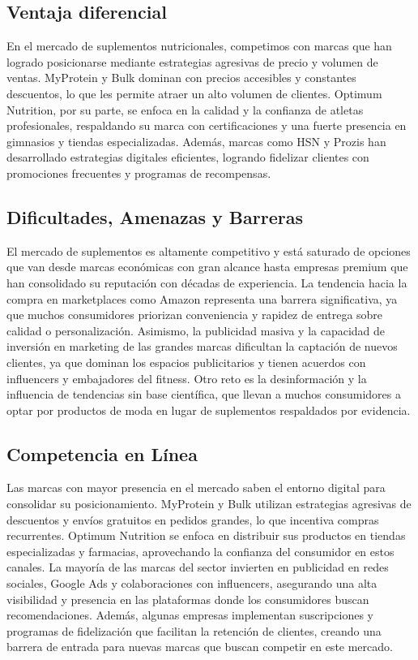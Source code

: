 \documentclass[11pt,a4paper]{report}
\begin{document}
\subsection{Ventaja diferencial}
En el mercado de suplementos nutricionales, competimos con marcas que han logrado posicionarse mediante estrategias agresivas de precio y volumen de ventas. MyProtein y Bulk dominan con precios accesibles y constantes descuentos, lo que les permite atraer un alto volumen de clientes. Optimum Nutrition, por su parte, se enfoca en la calidad y la confianza de atletas profesionales, respaldando su marca con certificaciones y una fuerte presencia en gimnasios y tiendas especializadas. Además, marcas como HSN y Prozis han desarrollado estrategias digitales eficientes, logrando fidelizar clientes con promociones frecuentes y programas de recompensas.

\subsection{Dificultades, Amenazas y Barreras}
El mercado de suplementos es altamente competitivo y está saturado de opciones que van desde marcas económicas con gran alcance hasta empresas premium que han consolidado su reputación con décadas de experiencia. La tendencia hacia la compra en marketplaces como Amazon representa una barrera significativa, ya que muchos consumidores priorizan conveniencia y rapidez de entrega sobre calidad o personalización. Asimismo, la publicidad masiva y la capacidad de inversión en marketing de las grandes marcas dificultan la captación de nuevos clientes, ya que dominan los espacios publicitarios y tienen acuerdos con influencers y embajadores del fitness. Otro reto es la desinformación y la influencia de tendencias sin base científica, que llevan a muchos consumidores a optar por productos de moda en lugar de suplementos respaldados por evidencia.


\subsection{Competencia en Línea}
Las marcas con mayor presencia en el mercado saben el entorno digital para consolidar su posicionamiento. MyProtein y Bulk utilizan estrategias agresivas de descuentos y envíos gratuitos en pedidos grandes, lo que incentiva compras recurrentes. Optimum Nutrition se enfoca en distribuir sus productos en tiendas especializadas y farmacias, aprovechando la confianza del consumidor en estos canales. La mayoría de las marcas del sector invierten en publicidad en redes sociales, Google Ads y colaboraciones con influencers, asegurando una alta visibilidad y presencia en las plataformas donde los consumidores buscan recomendaciones. Además, algunas empresas implementan suscripciones y programas de fidelización que facilitan la retención de clientes, creando una barrera de entrada para nuevas marcas que buscan competir en este mercado.
\end{document}
